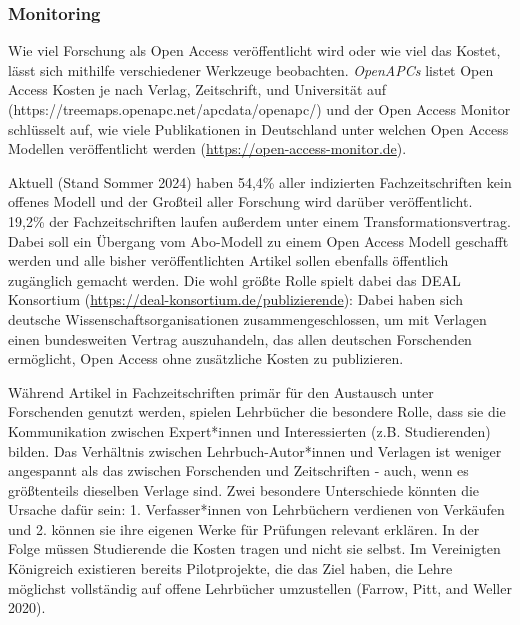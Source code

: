 \documentclass[
  letterpaper,
  DIV=11,
  numbers=noendperiod]{scrreprt}
\begin{document}
\subsubsection{Monitoring}\label{monitoring}

Wie viel Forschung als Open Access veröffentlicht wird oder wie viel das
Kostet, lässt sich mithilfe verschiedener Werkzeuge beobachten.
\emph{OpenAPCs} listet Open Access Kosten je nach Verlag, Zeitschrift,
und Universität auf (https://treemaps.openapc.net/apcdata/openapc/) und
der Open Access Monitor schlüsselt auf, wie viele Publikationen in
Deutschland unter welchen Open Access Modellen veröffentlicht werden
(\url{https://open-access-monitor.de}).

Aktuell (Stand Sommer 2024) haben 54,4\% aller indizierten
Fachzeitschriften kein offenes Modell und der Großteil aller Forschung
wird darüber veröffentlicht. 19,2\% der Fachzeitschriften laufen
außerdem unter einem Transformationsvertrag. Dabei soll ein Übergang vom
Abo-Modell zu einem Open Access Modell geschafft werden und alle bisher
veröffentlichten Artikel sollen ebenfalls öffentlich zugänglich gemacht
werden. Die wohl größte Rolle spielt dabei das DEAL Konsortium
(\url{https://deal-konsortium.de/publizierende}): Dabei haben sich
deutsche Wissenschaftsorganisationen zusammengeschlossen, um mit
Verlagen einen bundesweiten Vertrag auszuhandeln, das allen deutschen
Forschenden ermöglicht, Open Access ohne zusätzliche Kosten zu
publizieren.

\begin{tcolorbox}[enhanced jigsaw, title=\textcolor{quarto-callout-note-color}{\faInfo}\hspace{0.5em}{Offene Lehrbücher}, colbacktitle=quarto-callout-note-color!10!white, rightrule=.15mm, titlerule=0mm, left=2mm, bottomrule=.15mm, arc=.35mm, leftrule=.75mm, toprule=.15mm, opacityback=0, breakable, bottomtitle=1mm, colframe=quarto-callout-note-color-frame, toptitle=1mm, opacitybacktitle=0.6, coltitle=black, colback=white]

Während Artikel in Fachzeitschriften primär für den Austausch unter
Forschenden genutzt werden, spielen Lehrbücher die besondere Rolle, dass
sie die Kommunikation zwischen Expert*innen und Interessierten (z.B.
Studierenden) bilden. Das Verhältnis zwischen Lehrbuch-Autor*innen und
Verlagen ist weniger angespannt als das zwischen Forschenden und
Zeitschriften - auch, wenn es größtenteils dieselben Verlage sind. Zwei
besondere Unterschiede könnten die Ursache dafür sein: 1.
Verfasser*innen von Lehrbüchern verdienen von Verkäufen und 2. können
sie ihre eigenen Werke für Prüfungen relevant erklären. In der Folge
müssen Studierende die Kosten tragen und nicht sie selbst. Im
Vereinigten Königreich existieren bereits Pilotprojekte, die das Ziel
haben, die Lehre möglichst vollständig auf offene Lehrbücher umzustellen
(Farrow, Pitt, and Weller 2020).

\end{tcolorbox}
\end{document}
